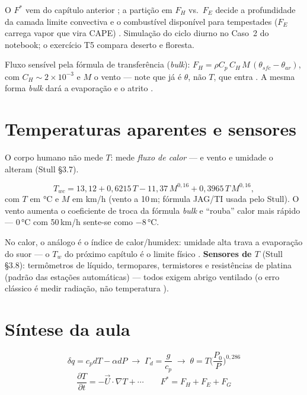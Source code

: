 \documentclass[11pt]{article}
\begin{document}
O $F^*$ vem do capítulo anterior ; a partição
em $F_H$ vs.\ $F_E$ decide a profundidade da camada limite convectiva
 e o combustível disponível para
tempestades ($F_E$ carrega vapor que vira CAPE)
. Simulação do ciclo diurno no Caso~2 do
notebook; o exercício T5 compara deserto e floresta.

Fluxo sensível pela fórmula de transferência (\emph{bulk}):
$F_H = \rho C_p\,C_H\,M\,(\theta_{sfc} - \theta_{ar})$, com
$C_H \sim 2\times10^{-3}$ e $M$ o vento — note que já é $\theta$, não $T$,
que entra . A mesma
forma \emph{bulk} dará a evaporação  e o atrito .

\section{Temperaturas aparentes e sensores}

O corpo humano não mede $T$: mede \emph{fluxo de calor} — e vento e
umidade o alteram (Stull \S3.7).

\begin{formalivro}
\[ T_{wc} = 13{,}12 + 0{,}6215\,T - 11{,}37\,M^{0{,}16}
 + 0{,}3965\,T\,M^{0{,}16}, \]
com $T$ em °C e $M$ em km/h (vento a 10\,m; fórmula JAG/TI usada
pelo Stull). O vento aumenta o coeficiente de troca da fórmula
\emph{bulk}  e ``rouba'' calor mais rápido —
$0\,°$C com 50\,km/h sente-se como $-8\,°$C.
\end{formalivro}

No calor, o análogo é o índice de calor/humidex: umidade alta trava a
evaporação do suor — o $T_w$ do próximo capítulo é o limite físico
. \textbf{Sensores de $T$} (Stull \S3.8):
termômetros de líquido, termopares, termistores e resistências de
platina (padrão das estações automáticas) — todos exigem abrigo
ventilado (o erro clássico é medir radiação, não temperatura
).

\section{Síntese da aula}

\begin{noquadro}
\[ \delta q = c_p dT - \alpha dP \;\to\; \Gamma_d = \frac{g}{c_p}
 \;\to\; \theta = T\Big(\frac{P_0}{P}\Big)^{0{,}286} \]
\[ \frac{\partial T}{\partial t} = -\vec U\cdot\nabla T + \cdots
 \qquad F^* = F_H + F_E + F_G \]
\end{noquadro}
\end{document}
